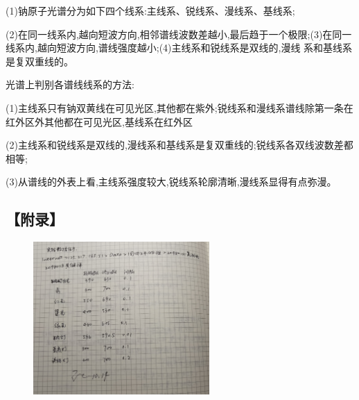 \documentclass[12pt,a4paper,UTF8]{ctexart}
\begin{document}
(1)钠原子光谱分为如下四个线系:主线系、锐线系、漫线系、基线系;

(2)在同一线系内,越向短波方向,相邻谱线波数差越小,最后趋于一个极限;(3)在同一线系内,越向短波方向,谱线强度越小;(4)主线系和锐线系是双线的,漫线
系和基线系是复双重线的。

光谱上判别各谱线线系的方法:

(1)主线系只有钠双黄线在可见光区,其他都在紫外;锐线系和漫线系谱线除第一条在红外区外其他都在可见光区,基线系在红外区

(2)主线系和锐线系是双线的,漫线系和基线系是复双重线的;锐线系各双线波数差都相等;

(3)从谱线的外表上看,主线系强度较大,锐线系轮廓清晰,漫线系显得有点弥漫。


\subsection*{【附录】}
\begin{figure}[htbp]
	\centering
	\includegraphics[width=0.6\textwidth]{img//9.jpg}
	\label{fig:9}
\end{figure}
\end{document}
